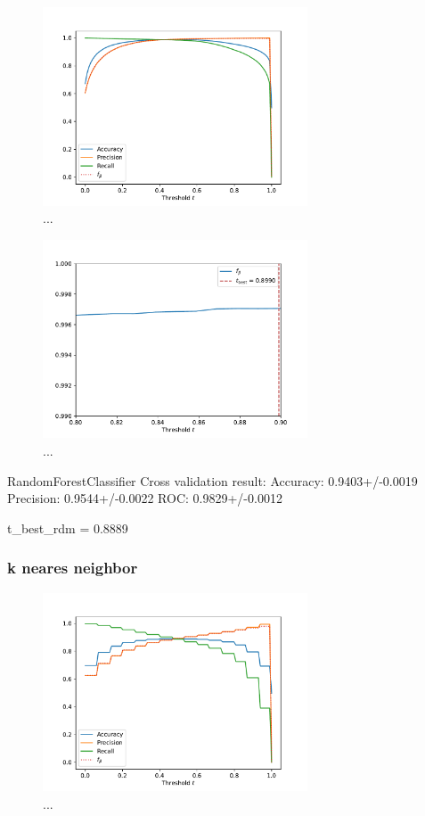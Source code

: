 \begin{figure}
    \centering
    \includegraphics[width=0.7\textwidth]{content/plots/apr_rdm.pdf}
    \caption{...}
    \label{fig:apr_rdm}
\end{figure}

\begin{figure}
    \centering
    \includegraphics[width=0.7\textwidth]{content/plots/f_beta_rdm.pdf}
    \caption{...}
    \label{fig:f_beta_rdm}
\end{figure}
RandomForestClassifier Cross validation result:
Accuracy: 0.9403+/-0.0019
Precision: 0.9544+/-0.0022
ROC: 0.9829+/-0.0012

t_best_rdm = 0.8889

\subsubsection{k neares neighbor}

\begin{figure}
    \centering
    \includegraphics[width=0.7\textwidth]{content/plots/apr_kNN.pdf}
    \caption{...}
    \label{fig:apr_kNN}
\end{figure}

